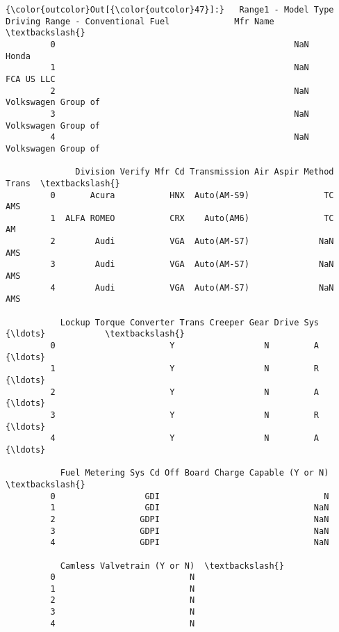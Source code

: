 \documentclass[11pt]{article}
\begin{document}
            \begin{Verbatim}[commandchars=\\\{\}]
{\color{outcolor}Out[{\color{outcolor}47}]:}   Range1 - Model Type Driving Range - Conventional Fuel             Mfr Name  \textbackslash{}
         0                                                NaN                   Honda   
         1                                                NaN              FCA US LLC   
         2                                                NaN     Volkswagen Group of   
         3                                                NaN     Volkswagen Group of   
         4                                                NaN     Volkswagen Group of   
         
              Division Verify Mfr Cd Transmission Air Aspir Method Trans  \textbackslash{}
         0       Acura           HNX  Auto(AM-S9)               TC   AMS   
         1  ALFA ROMEO           CRX    Auto(AM6)               TC    AM   
         2        Audi           VGA  Auto(AM-S7)              NaN   AMS   
         3        Audi           VGA  Auto(AM-S7)              NaN   AMS   
         4        Audi           VGA  Auto(AM-S7)              NaN   AMS   
         
           Lockup Torque Converter Trans Creeper Gear Drive Sys          {\ldots}            \textbackslash{}
         0                       Y                  N         A          {\ldots}             
         1                       Y                  N         R          {\ldots}             
         2                       Y                  N         A          {\ldots}             
         3                       Y                  N         R          {\ldots}             
         4                       Y                  N         A          {\ldots}             
         
           Fuel Metering Sys Cd Off Board Charge Capable (Y or N)  \textbackslash{}
         0                  GDI                                 N   
         1                  GDI                               NaN   
         2                 GDPI                               NaN   
         3                 GDPI                               NaN   
         4                 GDPI                               NaN   
         
           Camless Valvetrain (Y or N)  \textbackslash{}
         0                           N   
         1                           N   
         2                           N   
         3                           N   
         4                           N   
         

\end{Verbatim}
\end{document}
